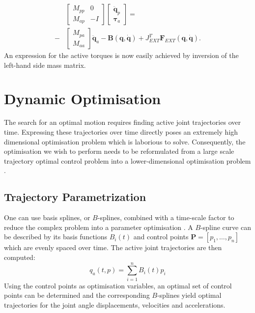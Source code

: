 \documentclass[letterpaper, 10 pt, conference]{ieeeconf}  %
\begin{document}
\begin{equation}
\begin{aligned}
&\left[\begin{array}{cc}  
M_{pp} & 0\\
M_{ap} &-I
\end{array} \right]
\left[\begin{array}{c}  
\mathbf{\ddot q}_p\\
\boldsymbol{\tau}_a
\end{array} \right] =\\ 
-&
\left[\begin{array}{c}  
M_{pa}\\
M_{aa}
\end{array} \right] 
\mathbf{\ddot q}_a-
\mathbf{B(q, \dot q)}+
J_{EXT}^T\mathbf{F}_{EXT}\mathbf{(q, \dot q)}.
\end{aligned}
\end{equation}	
An expression for the active torques is now easily achieved by inversion of the left-hand side mass matrix. 

\section{Dynamic Optimisation} \label{sec:dynamicOptimisation}

The search for an optimal motion requires finding active joint trajectories over time. Expressing these trajectories over time directly poses an extremely high dimensional optimisation problem which is laborious to solve. Consequently, the optimisation we wish to perform needs to be reformulated from a large scale trajectory optimal control problem into a lower-dimensional optimisation problem \cite{kaphle2008optimality}.


\subsection{Trajectory Parametrization}

One can use basis splines, or $B$-splines, combined with a time-scale factor to reduce the complex problem into a parameter optimisation \cite{ude2000planning,babivc2009biarticulated,wang1999weight,albro2001optimal}. A $B$-spline curve can be described by its basis functions $B_i(t)$ and control points $\mathbf{P}=\left[p_1,\dots,p_n\right]$ which are evenly spaced over time. The active joint trajectories are then computed:   
 \begin{equation}
q_a(t,p) = \sum_{i=1}^{n} B_i (t) p_i
\end{equation}
Using the control points as optimisation variables, an optimal set of control points can be determined and the corresponding $B$-splines yield optimal trajectories for the joint angle displacements, velocities and accelerations. 
\end{document}
